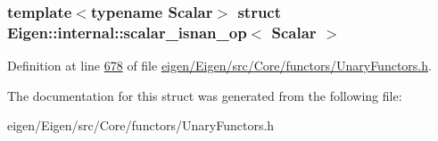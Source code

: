 \subsubsection*{template$<$typename Scalar$>$\newline
struct Eigen\+::internal\+::scalar\+\_\+isnan\+\_\+op$<$ Scalar $>$}



Definition at line \hyperlink{eigen_2_eigen_2src_2_core_2functors_2_unary_functors_8h_source_l00678}{678} of file \hyperlink{eigen_2_eigen_2src_2_core_2functors_2_unary_functors_8h_source}{eigen/\+Eigen/src/\+Core/functors/\+Unary\+Functors.\+h}.



The documentation for this struct was generated from the following file\+:\begin{DoxyCompactItemize}
\item 
eigen/\+Eigen/src/\+Core/functors/\+Unary\+Functors.\+h\end{DoxyCompactItemize}
